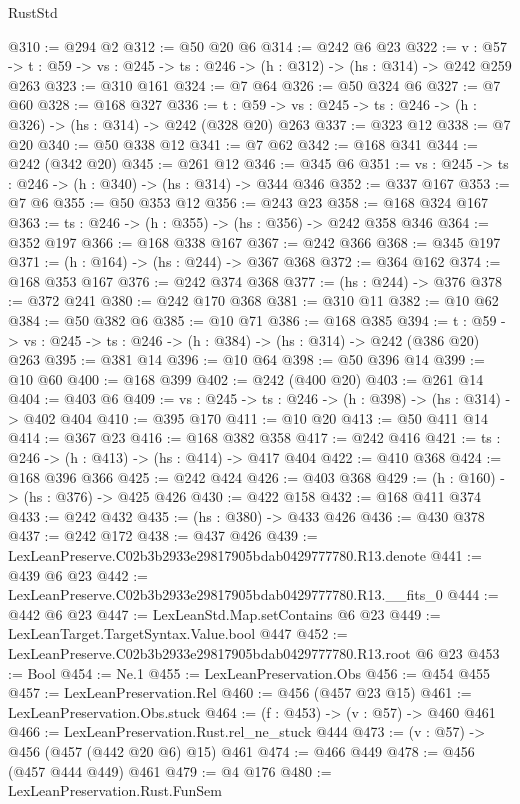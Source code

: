 \begin{lexlean}{RustStd}
\begin{coremodule}
@310 := @294 @2
@312 := @50 @20 @6
@314 := @242 @6 @23
@322 := {v : @57} ->
  {t : @59} -> {vs : @245} -> {ts : @246} -> (h : @312) -> (hs : @314) -> @242 @259 @263
@323 := @310 @161
@324 := @7 @64
@326 := @50 @324 @6
@327 := @7 @60
@328 := @168 @327
@336 := {t : @59} -> {vs : @245} -> {ts : @246} -> (h : @326) -> (hs : @314) -> @242 (@328 @20) @263
@337 := @323 @12
@338 := @7 @20
@340 := @50 @338 @12
@341 := @7 @62
@342 := @168 @341
@344 := @242 (@342 @20)
@345 := @261 @12
@346 := @345 @6
@351 := {vs : @245} -> {ts : @246} -> (h : @340) -> (hs : @314) -> @344 @346
@352 := @337 @167
@353 := @7 @6
@355 := @50 @353 @12
@356 := @243 @23
@358 := @168 @324 @167
@363 := {ts : @246} -> (h : @355) -> (hs : @356) -> @242 @358 @346
@364 := @352 @197
@366 := @168 @338 @167
@367 := @242 @366
@368 := @345 @197
@371 := (h : @164) -> (hs : @244) -> @367 @368
@372 := @364 @162
@374 := @168 @353 @167
@376 := @242 @374 @368
@377 := (hs : @244) -> @376
@378 := @372 @241
@380 := @242 @170 @368
@381 := @310 @11
@382 := @10 @62
@384 := @50 @382 @6
@385 := @10 @71
@386 := @168 @385
@394 := {t : @59} -> {vs : @245} -> {ts : @246} -> (h : @384) -> (hs : @314) -> @242 (@386 @20) @263
@395 := @381 @14
@396 := @10 @64
@398 := @50 @396 @14
@399 := @10 @60
@400 := @168 @399
@402 := @242 (@400 @20)
@403 := @261 @14
@404 := @403 @6
@409 := {vs : @245} -> {ts : @246} -> (h : @398) -> (hs : @314) -> @402 @404
@410 := @395 @170
@411 := @10 @20
@413 := @50 @411 @14
@414 := @367 @23
@416 := @168 @382 @358
@417 := @242 @416
@421 := {ts : @246} -> (h : @413) -> (hs : @414) -> @417 @404
@422 := @410 @368
@424 := @168 @396 @366
@425 := @242 @424
@426 := @403 @368
@429 := (h : @160) -> (hs : @376) -> @425 @426
@430 := @422 @158
@432 := @168 @411 @374
@433 := @242 @432
@435 := (hs : @380) -> @433 @426
@436 := @430 @378
@437 := @242 @172
@438 := @437 @426
@439 := LexLeanPreserve.C02b3b2933e29817905bdab0429777780.R13.denote
@441 := @439 @6 @23
@442 := LexLeanPreserve.C02b3b2933e29817905bdab0429777780.R13.__fits_0
@444 := @442 @6 @23
@447 := LexLeanStd.Map.setContains @6 @23
@449 := LexLeanTarget.TargetSyntax.Value.bool @447
@452 := LexLeanPreserve.C02b3b2933e29817905bdab0429777780.R13.root @6 @23
@453 := Bool
@454 := Ne.{1}
@455 := LexLeanPreservation.Obs
@456 := @454 @455
@457 := LexLeanPreservation.Rel
@460 := @456 (@457 @23 @15)
@461 := LexLeanPreservation.Obs.stuck
@464 := (f : @453) -> (v : @57) -> @460 @461
@466 := LexLeanPreservation.Rust.rel_ne_stuck @444
@473 := (v : @57) -> @456 (@457 (@442 @20 @6) @15) @461
@474 := @466 @449
@478 := @456 (@457 @444 @449) @461
@479 := @4 @176
@480 := LexLeanPreservation.Rust.FunSem

\end{coremodule}
\end{lexlean}
